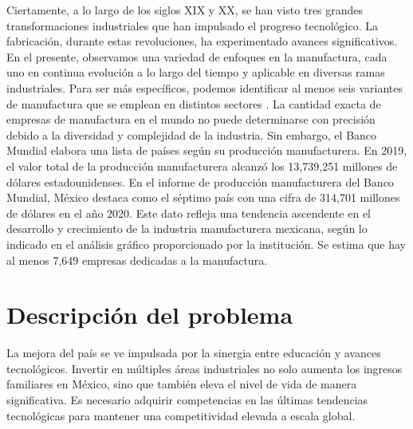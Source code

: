     Ciertamente, a lo largo de los siglos XIX y XX, se han visto tres grandes transformaciones industriales que han impulsado el progreso tecnológico. La fabricación, durante estas revoluciones, ha experimentado avances significativos. En el presente, observamos una variedad de enfoques en la manufactura, cada uno en continua evolución a lo largo del tiempo y aplicable en diversas ramas industriales. 
    Para ser más específicos, podemos identificar al menos seis variantes de manufactura que se emplean en distintos sectores \cite{industrialrevolutions}.
    La cantidad exacta de empresas de manufactura en el mundo no puede determinarse con precisión debido a la diversidad y complejidad de la industria. Sin embargo, el Banco Mundial elabora una lista de países según su producción manufacturera. En 2019, el valor total de la producción manufacturera alcanzó los 13,739,251 millones de dólares estadounidenses.
    En el informe de producción manufacturera del Banco Mundial, México destaca como el séptimo país con una cifra de 314,701 millones de dólares en el año 2020. Este dato refleja una tendencia ascendente en el desarrollo y crecimiento de la industria manufacturera mexicana, según lo indicado en el análisis gráfico proporcionado por la institución.
    Se estima que hay al menos 7,649 empresas dedicadas a la manufactura.
    
    \section{Descripción del problema}
    
    La mejora del país se ve impulsada por la sinergia entre educación y avances tecnológicos. Invertir en múltiples áreas industriales no solo aumenta los ingresos familiares en México, sino que también eleva el nivel de vida de manera significativa.
    Es necesario adquirir competencias en las últimas tendencias tecnológicas para mantener una competitividad elevada a escala global.
    
